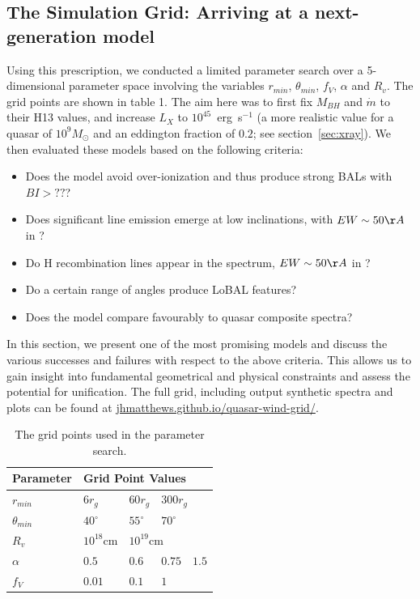 \documentclass[useAMS,usenatbib]{mn2e_x}
\begin{document}
\subsection{The Simulation Grid: Arriving at a next-generation model}

Using this prescription, we conducted a limited parameter
search over a 5-dimensional parameter space involving the 
variables $r_{min}$, $\theta_{min}$, $f_V$, $\alpha$ and $R_v$.
The grid points are shown in table 1.
The aim here was to first fix $M_{BH}$ and $\dot{m}$ to their H13 values,
and increase $L_X$ to $10^{45}$~erg~s$^{-1}$ (a more realistic value for a 
quasar of $10^9M_\odot$ and an eddington fraction of $0.2$; see section~\ref{sec:xray}). 
We then evaluated these models based on the following criteria:
\begin{itemize}
\item Does the model avoid over-ionization and thus produce strong BALs with $BI > ??$?
\item Does significant line emission emerge at low inclinations, with $EW\sim50\AA$ in \civ?
\item Do H recombination lines appear in the spectrum, $EW\sim50\AA$ in \la?
\item Do a certain range of angles produce LoBAL features?
\item Does the model compare favourably to quasar composite spectra?
\end{itemize}
In this section, we present one of the most promising models and discuss
the various successes and failures with respect to the above criteria.
This allows us to gain insight into fundamental geometrical 
and physical constraints and assess the potential for unification. 
The full grid, including output synthetic spectra and plots can be found at
\url{jhmatthews.github.io/quasar-wind-grid/}.

\begin{table}
\begin{tabular}{p{2cm}p{1cm}p{1cm}p{1cm}p{1cm}}
Parameter & \multicolumn{4}{|l|}{Grid Point Values}  \\
\hline \hline 
$r_{min}$ 	&	 $6r_{g}$ & $60r_{g}$ & \multicolumn{2}{|l|}{$300r_{g}$} \\ 
$\theta_{min}$ 	&	 $40^{\circ}$ & $55^{\circ}$ & \multicolumn{2}{|l|}{$70^{\circ}$} \\ 
$R_v$  	        &	 $10^{18}$cm & \multicolumn{3}{|l|}{$10^{19}$cm} \\ 
$\alpha$ 	&	 $0.5$ & $0.6$ & $0.75$ & $1.5$ \\
$f_V$ 	&	 $0.01$ & $0.1$ & \multicolumn{2}{|l|}{$1$}  \\
\hline 
\end{tabular}
\caption{The grid points used in the parameter search.}
\label{grid_table}
\end{table}
\end{document}
